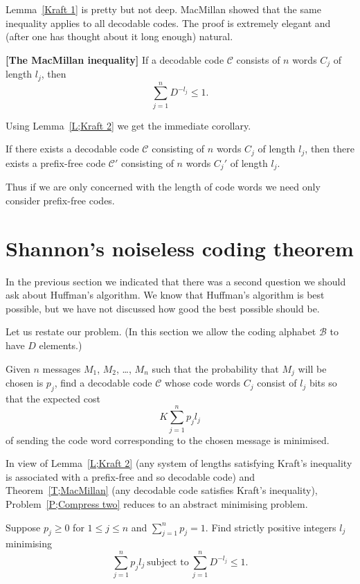Lemma~\ref{Kraft 1} is pretty but not deep.
MacMillan showed that the same inequality
applies to all decodable codes. The proof is extremely 
elegant and (after one has thought about it
long enough) natural.
\begin{theorem}\label{T;MacMillan}{\bf [The MacMillan inequality]}
If a decodable code ${\mathcal C}$ consists
of $n$ words $C_{j}$ of length $l_{j}$, then
\[\sum_{j=1}^{n}D^{-l_{j}}\leq 1.\]
\end{theorem}
Using Lemma~\ref{L;Kraft 2} we get the immediate corollary.
\begin{lemma} If there exists a decodable code ${\mathcal C}$ 
consisting 
of $n$ words $C_{j}$ of length $l_{j}$, then
there exists a prefix-free code ${\mathcal C}'$ 
consisting 
of $n$ words $C_{j}'$ of length $l_{j}$.
\end{lemma}
Thus if we are only concerned with the length of code words
we need only consider prefix-free codes.
\section{Shannon's noiseless coding theorem}
In the previous section we indicated that there
was a second question we should ask about Huffman's
algorithm. We know that Huffman's algorithm is
best possible, but we have not discussed how good the
best possible should be.

Let us restate our problem. (In this section we allow
the coding alphabet ${\mathcal B}$ to have $D$ elements.) 
\begin{problem}\label{P;Compress two}
Given $n$ messages $M_{1}$, $M_{2}$,
\dots, $M_{n}$ such that the probability that $M_{j}$
will be chosen is $p_{j}$, find a decodable
code ${\mathcal C}$ whose code words  $C_{j}$
consist of $l_{j}$ bits so that the expected cost
\[K\sum_{j=1}^{n}p_{j}l_{j}\]
of sending the code word corresponding to the chosen
message is minimised.
\end{problem}
In view of Lemma~\ref{L;Kraft 2}
(any system of lengths
satisfying Kraft's inequality is associated  
with a prefix-free and so decodable code)
and Theorem~\ref{T;MacMillan} (any decodable
code satisfies Kraft's inequality),
Problem~\ref{P;Compress two} reduces to
an abstract minimising problem.
\begin{problem}\label{P;Compress three}
Suppose $p_{j}\geq 0$ for $1\leq j\leq n$ and $\sum_{j=1}^{n}p_{j}=1$.
Find strictly positive integers $l_{j}$  minimising
\[\sum_{j=1}^{n}p_{j}l_{j}\ \text{subject to} 
\ \sum_{j=1}^{n}D^{-l_{j}}\leq 1.\]
\end{problem}

